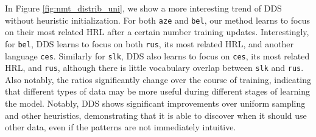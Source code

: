 In Figure \ref{fig:nmt_distrib_uni}, we show a more interesting trend of DDS without heuristic initialization.
For both \texttt{aze} and \texttt{bel}, our method learns to focus on their most related HRL after a certain number training updates.
Interestingly, for \texttt{bel}, DDS learns to focus on both \texttt{rus}, its most related HRL, and another language \texttt{ces}. Similarly for \texttt{slk}, DDS also learns to focus on \texttt{ces}, its most related HRL, and \texttt{rus}, although there is little vocabulary overlap between \texttt{slk} and \texttt{rus}.
Also notably, the ratios significantly change over the course of training, indicating that different types of data may be more useful during different stages of learning the model.
Notably, DDS shows significant improvements over uniform sampling and other heuristics, demonstrating that it is able to discover when it should use other data, even if the patterns are not immediately intuitive.
